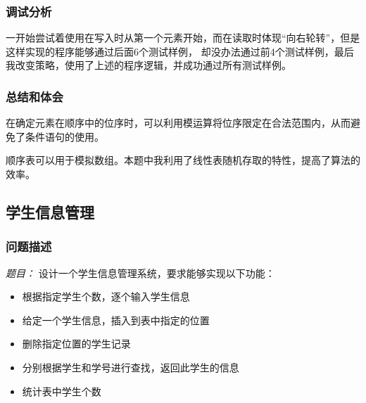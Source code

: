 \documentclass[a4paper,11pt]{article}%
\newenvironment{shadedquotation}
 {\begin{shaded*}
  \quoting[leftmargin=0pt, vskip=0pt]
 }
 {\endquoting
 \end{shaded*}
}
\begin{document}
\subsubsection{调试分析}
一开始尝试着使用在写入时从第一个元素开始，而在读取时体现“向右轮转”，但是这样实现的程序能够通过后面6个测试样例，
却没办法通过前4个测试样例，最后我改变策略，使用了上述的程序逻辑，并成功通过所有测试样例。
\subsubsection{总结和体会}
在确定元素在顺序中的位序时，可以利用模运算将位序限定在合法范围内，从而避免了条件语句的使用。

顺序表可以用于模拟数组。本题中我利用了线性表随机存取的特性，提高了算法的效率。
\subsection{学生信息管理}
\subsubsection{问题描述}
\begin{shadedquotation}
    \emph{题目：}
    设计一个学生信息管理系统，要求能够实现以下功能：
    \begin{itemize}
        \item 根据指定学生个数，逐个输入学生信息
        \item 给定一个学生信息，插入到表中指定的位置
        \item 删除指定位置的学生记录
        \item 分别根据学生和学号进行查找，返回此学生的信息
        \item 统计表中学生个数
    \end{itemize}
\end{shadedquotation}    
\end{document}
